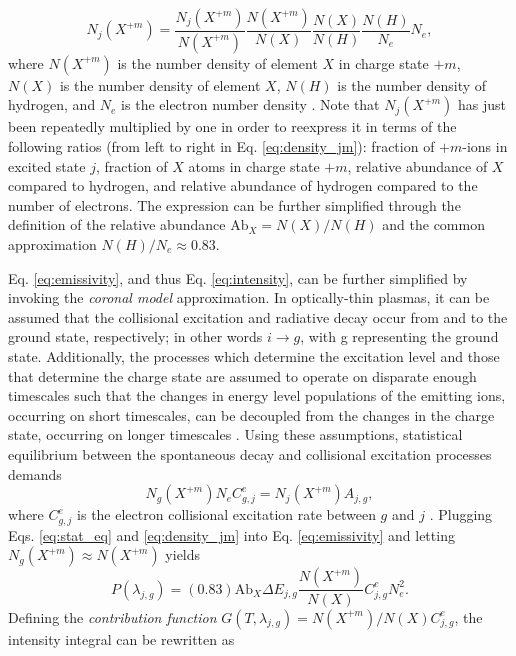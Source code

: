 \begin{equation}
	\label{eq:density_jm}
	N_j(X^{+m})=\frac{N_j(X^{+m})}{N(X^{+m})}\frac{N(X^{+m})}{N(X)}\frac{N(X)}{N(H)}\frac{N(H)}{N_e}N_e,
\end{equation}
where $N(X^{+m})$ is the number density of element $X$ in charge state $+m$, $N(X)$ is the number density of element $X$, $N(H)$ is the number density of hydrogen, and $N_e$ is the electron number density \citep{mason_spectroscopic_1994}. Note that $N_j(X^{+m})$ has just been repeatedly multiplied by one in order to reexpress it in terms of the following ratios (from left to right in Eq. \ref{eq:density_jm}): fraction of $+m$-ions in excited state $j$, fraction of $X$ atoms in charge state $+m$, relative abundance of $X$ compared to hydrogen, and relative abundance of hydrogen compared to the number of electrons. The expression can be further simplified through the definition of the relative abundance $\mathrm{Ab}_X=N(X)/N(H)$ and the common approximation $N(H)/N_e\approx0.83$.
%
\par Eq. \ref{eq:emissivity}, and thus Eq. \ref{eq:intensity}, can be further simplified by invoking the \textit{coronal model} approximation. In optically-thin plasmas, it can be assumed that the collisional excitation and radiative decay occur from and to the ground state, respectively; in other words $i\to g$, with g representing the ground state. Additionally, the processes which determine the excitation level and those that determine the charge state are assumed to operate on disparate enough timescales such that the changes in energy level populations of the emitting ions, occurring on short timescales, can be decoupled from the changes in the charge state, occurring on longer timescales \citep{bradshaw_collisional_2013}. Using these assumptions, statistical equilibrium between the spontaneous decay and collisional excitation processes demands
\begin{equation}
	\label{eq:stat_eq}
	N_g(X^{+m})N_eC^e_{g,j} = N_j(X^{+m})A_{j,g},
\end{equation}
where $C^e_{g,j}$ is the electron collisional excitation rate between $g$ and $j$ \citep{bradshaw_collisional_2013}. Plugging Eqs. \ref{eq:stat_eq} and \ref{eq:density_jm} into Eq. \ref{eq:emissivity} and letting $N_g(X^{+m})\approx N(X^{+m})$ yields
\begin{equation}
	\label{eq:emissivity_simple}
	P(\lambda_{j,g})=(0.83)\mathrm{Ab}_X\Delta E_{j,g}\frac{N(X^{+m})}{N(X)}C^e_{j,g}N_e^2.
\end{equation}
Defining the \textit{contribution function} $G(T,\lambda_{j,g})=N(X^{+m})/N(X)C^e_{j,g}$, the intensity integral can be rewritten as
